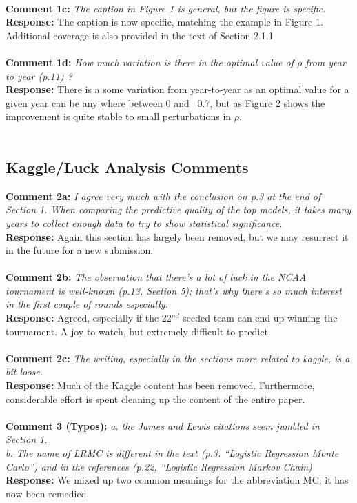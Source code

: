 \documentclass[11pt]{article} %
\begin{document}
\\
{\bf Comment 1c:}  \emph{The caption in Figure 1 is general, but the figure is specific.} \\
{\bf Response:} The caption is now specific, matching the example in Figure 1. Additional coverage is also provided in the text of Section 2.1.1\\
\\
{\bf Comment 1d:}  \emph{How much variation is there in the optimal value of $\rho$ from year to year (p.11) ?} \\
{\bf Response:} There is a some variation from year-to-year as an optimal value for a given year can be any where between 0 and ~0.7, but as Figure 2 shows the improvement is quite stable to small perturbations in $\rho$.  \\
\\
\subsection*{Kaggle/Luck Analysis Comments}
{\bf Comment 2a:}  \emph{I agree very much with the conclusion on p.3 at the end of Section 1. When comparing the predictive quality of the top models, it takes many years to collect enough data to try to show statistical significance.} \\
{\bf Response:} Again this section has largely been removed, but we may resurrect it in the future for a new submission.\\
\\
{\bf Comment 2b:}  \emph{The observation that there's a lot of luck in the NCAA tournament is well-known (p.13, Section 5); that's why there's so much interest in the first couple of rounds especially.} \\
{\bf Response:} Agreed, especially if the 22$^{nd}$ seeded team can end up winning the tournament. A joy to watch, but extremely difficult to predict.\\
\\
{\bf Comment 2c:}  \emph{The writing, especially in the sections more related to kaggle, is a bit loose.} \\
{\bf Response:} Much of the Kaggle content has been removed. Furthermore, considerable effort is spent cleaning up the content of the entire paper.\\
\\
{\bf Comment 3 (Typos):}  \emph{a. the James and Lewis citations seem jumbled in Section 1. \\ b. The name of LRMC is different in the text (p.3. ``Logistic Regression Monte Carlo'') and in the references (p.22, ``Logistic Regression Markov Chain)} \\
{\bf Response:} We mixed up two common meanings for the abbreviation MC; it has now been remedied.\\
\\
\end{document}
